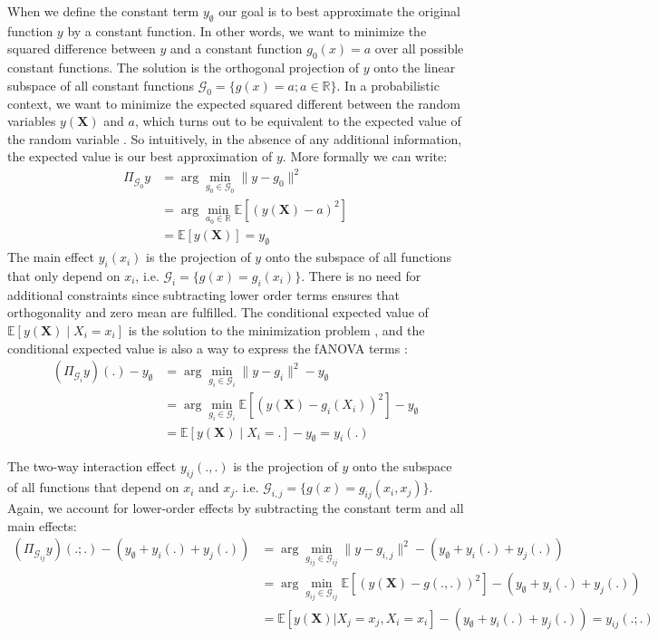 When we define the constant term $y_\emptyset$ our goal is to best approximate the original function $y$ by a constant function. In other words, we want to minimize the squared difference between $y$ and a constant function $g_0(x) = a$ over all possible constant functions. The solution is the orthogonal projection of $y$ onto the linear subspace of all constant functions $\mathcal{G}_0 = \{g(x) = a; a \in \mathbb{R}\}$. In a probabilistic context, we want to minimize the expected squared different between the random variables $y(\boldsymbol{X})$ and $a$, which turns out to be equivalent to the expected value of the random variable \citep{Vaart_1998}. So intuitively, in the absence of any additional information, the expected value is our best approximation of $y$. More formally we can write:
\begin{align*}
    \Pi_{\mathcal{G}_0}y
    &= \arg \min_{g_0 \in \mathcal{G}_0} \|y - g_0\|^2 \\ %
    &= \arg \min_{a_0 \in \mathbb{R}} \mathbb{E}[(y(\boldsymbol{X}) - a)^2] \\ %
    &= \mathbb{E}[y(\boldsymbol{X})] = y_{\emptyset}
\end{align*}
The main effect $y_i(x_i)$ is the projection of $y$ onto the subspace of all functions that only depend on $x_i$, i.e. $\mathcal{G}_i = \{g(x) = g_i(x_i)\}$. There is no need for additional constraints since subtracting lower order terms ensures that orthogonality and zero mean are fulfilled.
The conditional expected value of $\mathbb{E}[y(\boldsymbol{X}) \mid X_i = x_i]$ is the solution to the minimization problem \citep{Vaart_1998}, and the conditional expected value is also a way to express the fANOVA terms \citep{muehlenstaedt2012}:
\begin{align*}
    (\Pi_{\mathcal{G}_i}y)(.) - y_{\emptyset}
    &= \arg \min_{g_i \in \mathcal{G}_i} \|y - g_i\|^2 - y_{\emptyset}\\
    &= \arg \min_{g_i \in \mathcal{G}_i} \mathbb{E}[(y(\boldsymbol{X}) - g_i(X_i))^2] - y_{\emptyset} \\
    &= \mathbb{E}[y(\boldsymbol{X}) \mid X_i = .] - y_{\emptyset} = y_i(.)
\end{align*}

The two-way interaction effect $y_{ij}(.,.)$ is the projection of $y$ onto the subspace of all functions that depend on $x_i$ and $x_j$. i.e. $\mathcal{G}_{i,j} = \{g(x) = g_{ij}(x_i, x_j)\}$. Again, we account for lower-order effects by subtracting the constant term and all main effects:
\begin{align*}
    (\Pi_{\mathcal{G}_{ij}}y)(.;.) - (y_{\emptyset} + y_i(.) + y_j(.))
    &= \arg \min_{g_{ij} \in \mathcal{G}_{ij}} \|y - g_{i, j}\|^2 - (y_{\emptyset} + y_i(.) + y_j(.))\\
    &= \arg \min_{g_{ij} \in \mathcal{G}_{ij}} \mathbb{E}[(y(\boldsymbol{X}) - g(., .))^2] - (y_{\emptyset} + y_i(.) + y_j(.))\\
    &= \mathbb{E}[y(\boldsymbol{X}) | X_j = x_j, X_i = x_i] - (y_{\emptyset} + y_i(.) + y_j(.)) = y_{ij}(.;.)
\end{align*}

